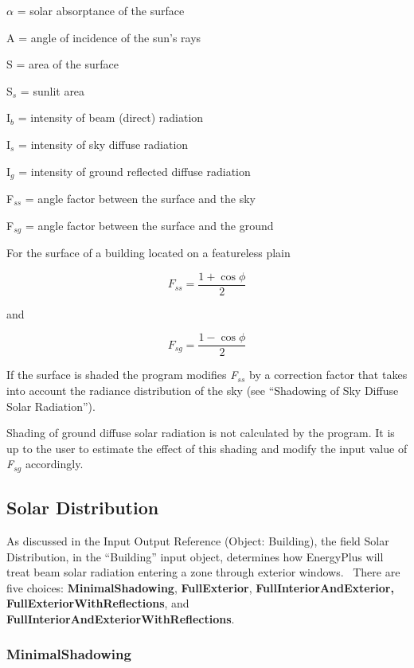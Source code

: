 $\alpha$ = solar absorptance of the surface

A = angle of incidence of the sun's rays

S = area of the surface

S\(_{s}\) = sunlit area

I\(_{b}\) = intensity of beam (direct) radiation

I\(_{s}\) = intensity of sky diffuse radiation

I\(_{g}\) = intensity of ground reflected diffuse radiation

F\(_{ss}\) = angle factor between the surface and the sky

F\(_{sg}\) = angle factor between the surface and the ground

For the surface of a building located on a featureless plain

\begin{equation}
{F_{ss}} = \frac{{1 + \cos \phi }}{2}
\end{equation}

and

\begin{equation}
{F_{sg}} = \frac{{1 - \cos \phi }}{2}
\end{equation}

If the surface is shaded the program modifies \emph{F\(_{ss}\)} by a correction factor that takes into account the radiance distribution of the sky (see ``Shadowing of Sky Diffuse Solar Radiation'').

Shading of ground diffuse solar radiation is not calculated by the program. It is up to the user to estimate the effect of this shading and modify the input value of \emph{F\(_{sg}\)} accordingly.

\subsection{Solar Distribution}\label{solar-distribution}

As discussed in the Input Output Reference (Object: Building), the field Solar Distribution, in the ``Building'' input object, determines how EnergyPlus will treat beam solar radiation entering a zone through exterior windows.~ There are five choices: \textbf{MinimalShadowing}, \textbf{FullExterior}, \textbf{FullInteriorAndExterior, FullExteriorWithReflections}, and \textbf{FullInteriorAndExteriorWithReflections}.

\subsubsection{MinimalShadowing}\label{minimalshadowing}

